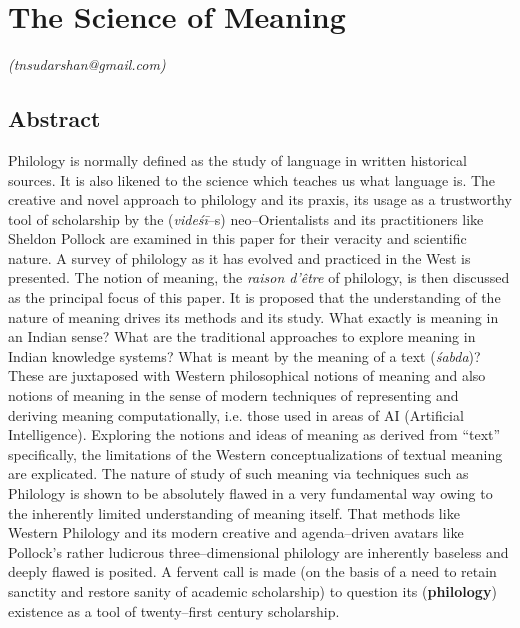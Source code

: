 
\chapter{The Science of Meaning}\label{chapter7}


\begin{flushright}
\textit{(tnsudarshan@gmail.com)}
\end{flushright}


\section*{Abstract}

Philology is normally defined as the study of language in written historical sources. It is also likened to the science which teaches us what language is. The creative and novel approach to philology and its praxis, its usage as a trustworthy tool of scholarship by the (\textit{videśī}–s) neo–Orientalists and its practitioners like Sheldon Pollock are examined in this paper for their veracity and scientific nature. A survey of philology as it has evolved and practiced in the West is presented. The notion of meaning, the \textit{raison d’être} of philology, is then discussed as the principal focus of this paper. It is proposed that the understanding of the nature of meaning drives its methods and its study. What exactly is meaning in an Indian sense? What are the traditional approaches to explore meaning in Indian knowledge systems? What is meant by the meaning of a text (\textit{śabda})? These are juxtaposed with Western philosophical notions of meaning and also notions of meaning in the sense of modern techniques of representing and deriving meaning computationally, i.e. those used in areas of AI (Artificial Intelligence). Exploring the notions and ideas of meaning as derived from “text” specifically, the limitations of the Western conceptualizations of textual meaning are explicated. The nature of study of such meaning via techniques such as Philology is shown to be absolutely flawed in a very fundamental way owing to the inherently limited understanding of meaning itself. That methods like Western Philology and its modern creative and agenda–driven avatars like Pollock’s rather ludicrous three–dimensional philology are inherently baseless and deeply flawed is posited. A fervent call is made (on the basis of a need to retain sanctity and restore sanity of academic scholarship) to question its (\textbf{philology}) existence as a tool of twenty–first century scholarship.

